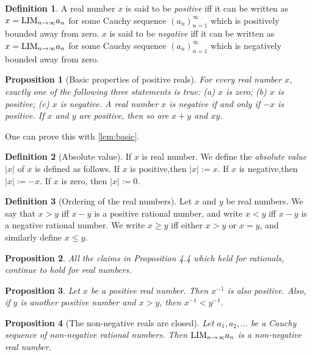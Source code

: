 \documentclass[
]{book}
\newtheorem{proposition}{Proposition}[chapter]
\theoremstyle{definition}
\newtheorem{definition}{Definition}[chapter]
\theoremstyle{definition}
\theoremstyle{definition}
\theoremstyle{definition}
\theoremstyle{remark}
\begin{document}
\begin{definition}
A real number \(x\) is said to be \emph{positive} iff it can be written as \(x={\rm LIM}_{n\to \infty}a_n\) for some Cauchy sequence \((a_n)_{n=1}^{\infty}\) which is positively bounded away from zero. \(x\) is said to be \emph{negative} iff it can be written as \(x={\rm LIM}_{n\to \infty}a_n\) for some Cauchy sequence \((a_n)_{n=1}^{\infty}\) which is negatively bounded away from zero.
\end{definition}

\begin{proposition}[Basic properties of positive reals]
For every real number \(x\), exactly one of the following three statements is true: (a) \(x\) is zero; (b) \(x\) is positive; (c) \(x\) is negative. A real number \(x\) is negative if and only if \(-x\) is positive. If \(x\) and \(y\) are positive, then so are \(x+y\) and \(xy\).
\end{proposition}

One can prove this with \ref{lem:basic}.

\begin{definition}[Absolute value]
If \(x\) is real number. We define the \emph{absolute value} \(|x|\) of \(x\) is defined as follows. If \(x\) is positive,then \(|x|:=x\). If \(x\) is negative,then \(|x|:=-x\). If \(x\) is zero, then \(|x|:=0\).
\end{definition}

\begin{definition}[Ordering of the real numbers]
Let \(x\) and \(y\) be real numbers. We say that \(x>y\) iff \(x-y\) is a positive rational number, and write \(x<y\) iff \(x-y\) is a negative rational number. We write \(x\geq y\) iff either \(x>y\) or \(x=y\), and similarly define \(x\leq y\).
\end{definition}

\begin{proposition}
All the claims in Proposition 4.4 which held for rationals, continue to hold for real numbers.
\end{proposition}

\begin{proposition}
Let \(x\) be a positive real number. Then \(x^{-1}\) is also positive. Also, if \(y\) is another positive number and \(x>y\), then \(x^{-1} < y^{-1}\).
\end{proposition}

\begin{proposition}[The non-negative reals are closed]
Let \(a_1,a_2,\dots\) be a Cauchy sequence of non-negative rational numbers. Then \({\rm LIM}_{n\to \infty}a_n\) is a non-negative real number.
\end{proposition}
\end{document}
